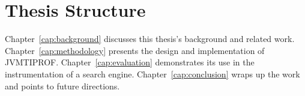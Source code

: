 \section{Thesis Structure}

Chapter~\ref{cap:background} discusses this thesis's background and related work. Chapter~\ref{cap:methodology} presents the design and implementation of JVMTIPROF. Chapter~\ref{cap:evaluation} demonstrates its use in the instrumentation of a search engine. Chapter~\ref{cap:conclusion} wraps up the work and points to future directions.


